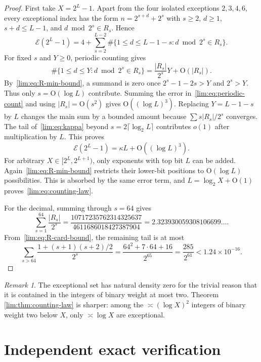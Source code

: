 \documentclass[11pt]{article}
\theoremstyle{definition}
\theoremstyle{remark}
\newtheorem{remark}[theorem]{Remark}
\newcommand{\Oh}{\mathrm O}
\begin{document}
\begin{proof}
First take $X=2^L-1$.  Apart from the four isolated exceptions
$2,3,4,6$, every exceptional index has the form
$n=2^{s+d}+2^s$ with $s\ge2$, $d\ge1$, $s+d\le L-1$, and
$d\bmod2^s\in R_s$.  Hence
\begin{equation}\label{lim:eq:dyadic-count}
 \mathcal E(2^L-1)
 =4+\sum_{s=2}^{L-2}
   \#\{1\le d\le L-1-s:d\bmod2^s\in R_s\}.
\end{equation}
For fixed $s$ and $Y\ge0$, periodic counting gives
\begin{equation}\label{lim:eq:periodic-count}
 \#\{1\le d\le Y:d\bmod2^s\in R_s\}
 =\frac{|R_s|}{2^s}Y+\Oh(|R_s|).
\end{equation}
By~\eqref{lim:eq:R-min-bound}, a summand is zero once
$2^s-1-2s>Y$ and $2^s>Y$.  Thus only $s=\Oh(\log L)$ contribute.
Summing the error in~\eqref{lim:eq:periodic-count} and using
$|R_s|=\Oh(s^2)$ gives $\Oh((\log L)^3)$.  Replacing $Y=L-1-s$ by $L$
changes the main sum by a bounded amount because
$\sum s|R_s|/2^s$ converges.  The tail of~\eqref{lim:eq:kappa} beyond
$s=2\lceil\log_2L\rceil$ contributes $o(1)$ after multiplication by $L$.
This proves
\[
  \mathcal E(2^L-1)=\kappa L+\Oh((\log L)^3).
\]
For arbitrary $X\in[2^L,2^{L+1})$, only exponents with top bit $L$ can be
added.  Again~\eqref{lim:eq:R-min-bound} restricts their lower-bit positions to
$\Oh(\log L)$ possibilities.  This is absorbed by the same error term, and
$L=\log_2X+\Oh(1)$ proves~\eqref{lim:eq:counting-law}.

For the decimal, summing through $s=64$ gives
\[
 \sum_{s=1}^{64}\frac{|R_s|}{2^s}
 =\frac{10717235762314325637}{4611686018427387904}
 =2.323930059308106699\ldots.
\]
From~\eqref{lim:eq:R-card-bound}, the remaining tail is at most
\[
 \sum_{s>64}\frac{1+(s+1)(s+2)/2}{2^s}
 =\frac{64^2+7\cdot64+16}{2^{65}}
 =\frac{285}{2^{61}}<1.24\times10^{-16}.
\]
\end{proof}

\begin{remark}
The exceptional set has natural density zero for the trivial reason that it
is contained in the integers of binary weight at most two.  Theorem
\ref{lim:thm:counting-law} is sharper: among the $\asymp(\log X)^2$ integers of
binary weight two below $X$, only $\asymp\log X$ are exceptional.
\end{remark}

\section{Independent exact verification}
\label{lim:sec:verification}
\end{document}
